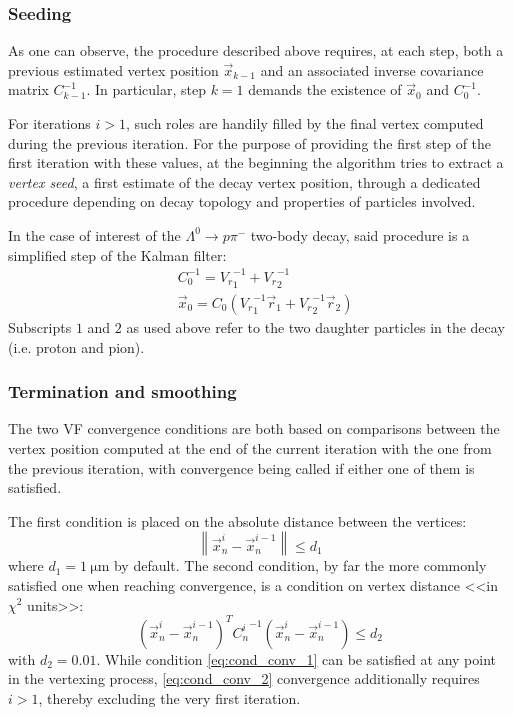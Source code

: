 \subsubsection{Seeding}

As one can observe, the procedure described above requires, at each step, both a previous estimated vertex position $\vec{x}_{k-1}$ and an associated inverse covariance matrix $C_{k-1}^{-1}$. In particular, step $k=1$ demands the existence of $\vec{x}_0$ and $C_{0}^{-1}$.

For iterations $i>1$, such roles are handily filled by the final vertex computed during the previous iteration.
For the purpose of providing the first step of the first iteration with these values, at the beginning the algorithm tries to extract a \textit{vertex seed}, a first estimate of the decay vertex position, through a dedicated procedure depending on decay topology and properties of particles involved.

In the case of interest of the $\Lambda^0 \rightarrow p \pi^-$ two-body decay, said procedure is a simplified step of the Kalman filter:
\begin{subequations}
\begin{align}
	&C^{-1}_0 = {V_r}_1^{-1}  + {V_r}_2^{-1} \\
	&\vec{x}_0 = C_0 \left(
		{V_r}_1^{-1} \vec{r}_1 + {V_r}_2^{-1} \vec{r}_2
	\right)
\end{align}
\end{subequations}
Subscripts $1$ and $2$ as used above refer to the two daughter particles in the decay (i.e. proton and pion).

\subsubsection{Termination and smoothing}
The two VF convergence conditions are both based on comparisons between the vertex position computed at the end of the current iteration with the one from the previous iteration, with convergence being called if either one of them is satisfied.

The first condition is placed on the absolute distance between the vertices:
\begin{equation}
	\left\|
	\vec{x}_n^{i} - \vec{x}_n^{i-1}
	\right\| \leq d_1
	\label{eq:cond_conv_1}
\end{equation}
where $d_1 = \SI{1}{\micro\meter}$ by default.
The second condition, by far the more commonly satisfied one when reaching convergence, is a condition on vertex distance <<in $\chi^2$ units>>:
\begin{equation}
	{\left(
	\vec{x}_n^{i} - \vec{x}_n^{i-1}
	\right)}^T
	{C_n^i}^{-1}
	\left(
	\vec{x}_n^{i} - \vec{x}_n^{i-1}
	\right)
	\leq d_2
	\label{eq:cond_conv_2}
\end{equation}
with $d_2 = 0.01$.
While condition \eqref{eq:cond_conv_1} can be satisfied at any point in the vertexing process, \eqref{eq:cond_conv_2} convergence additionally requires $i>1$, thereby excluding the very first iteration.

